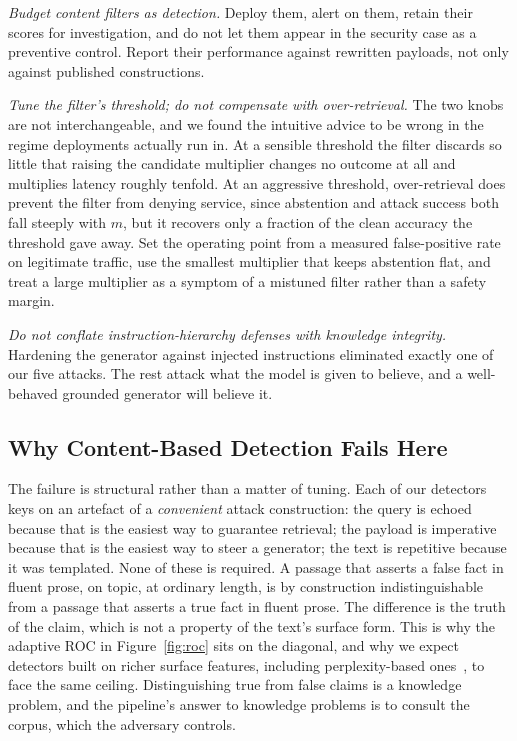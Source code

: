 \documentclass[information,article,submit,moreauthors]{Definitions/mdpi}
\begin{document}
\emph{Budget content filters as detection.} Deploy them, alert on them, retain their scores for
investigation, and do not let them appear in the security case as a preventive control. Report
their performance against rewritten payloads, not only against published constructions.

\emph{Tune the filter's threshold; do not compensate with over-retrieval.} The two knobs are
not interchangeable, and we found the intuitive advice to be wrong in the regime deployments
actually run in. At a sensible threshold the filter discards so little that raising the
candidate multiplier changes no outcome at all and multiplies latency roughly tenfold. At an
aggressive threshold, over-retrieval does prevent the filter from denying service, since
abstention and attack success both fall steeply with $m$, but it recovers only a fraction of
the clean
accuracy the threshold gave away. Set the operating point from a measured false-positive rate
on legitimate traffic, use the smallest multiplier that keeps abstention flat, and treat a
large multiplier as a symptom of a mistuned filter rather than a safety margin.

\emph{Do not conflate instruction-hierarchy defenses with knowledge integrity.} Hardening the
generator against injected instructions eliminated exactly one of our five attacks. The rest
attack what the model is given to believe, and a well-behaved grounded generator will believe
it.

\subsection{Why Content-Based Detection Fails Here}

The failure is structural rather than a matter of tuning. Each of our detectors keys on an
artefact of a \emph{convenient} attack construction: the query is echoed because that is the
easiest way to guarantee retrieval; the payload is imperative because that is the easiest way
to steer a generator; the text is repetitive because it was templated. None of these is
required. A passage that asserts a false fact in fluent prose, on topic, at ordinary length, is
by construction indistinguishable from a passage that asserts a true fact in fluent prose.
The difference is the truth of the claim, which is not a property of the text's surface form. This
is why the adaptive ROC in Figure~\ref{fig:roc} sits on the diagonal, and why we expect
detectors built on richer surface features, including perplexity-based
ones~\citep{alon2023perplexity,jain2023baseline}, to face the same ceiling. Distinguishing true
from false claims is a knowledge problem, and the pipeline's answer to knowledge problems is to
consult the corpus, which the adversary controls.
\end{document}
